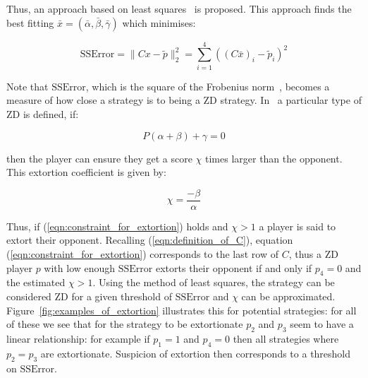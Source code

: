 \documentclass[a4paper]{article}
\begin{document}
Thus, an approach based on least squares~\cite{Golub2013} is proposed. This
approach finds the best fitting \(\bar x=(\bar\alpha, \bar\beta,
\bar\gamma)\) which minimises:

\begin{equation}\label{eqn:r_squared}
    \text{SSError} = \|C x-\tilde p\|_2^2 = \sum_{i=1}^{4}\left((C\bar x)_i-\tilde p_i\right)^2
\end{equation}

Note that \(\text{SSError}\), which is the square of the Frobenius
norm~\cite{Golub2013}, becomes a measure of how close a strategy is to being a ZD
strategy.
In~\cite{Press2012} a particular type of ZD is defined, if:

\begin{equation}\label{eqn:constraint_for_extortion}
    P(\alpha + \beta)+\gamma=0
\end{equation}

then the player can ensure they get a score \(\chi\) times
larger than the opponent. This extortion coefficient is given by:

\begin{equation}\label{eqn:definition_of_chi}
    \chi=\frac{-\beta}{\alpha}
\end{equation}

Thus, if (\ref{eqn:constraint_for_extortion}) holds and \(\chi >1\) a player is
said to extort their opponent. Recalling (\ref{eqn:definition_of_C}), equation
(\ref{eqn:constraint_for_extortion}) corresponds to the last row of \(C\), thus
a ZD player \(p\) with low enough \(\text{SSError}\) extorts their opponent if
and only if \(p_4=0\) and the estimated \(\chi > 1\). Using the method of least
squares, the strategy can be considered ZD for a given threshold of
\(\text{SSError}\) and \(\chi\) can be approximated.
Figure~\ref{fig:examples_of_extortion} illustrates this for potential
strategies: for all of these we see that for the strategy to be extortionate
\(p_2\) and \(p_3\) seem to have a linear relationship: for example if \(p_1=1\)
and \(p_4=0\) then all strategies where \(p_2=p_3\) are extortionate. Suspicion
of extortion then corresponds to a threshold on \(\text{SSError}\).
\end{document}
